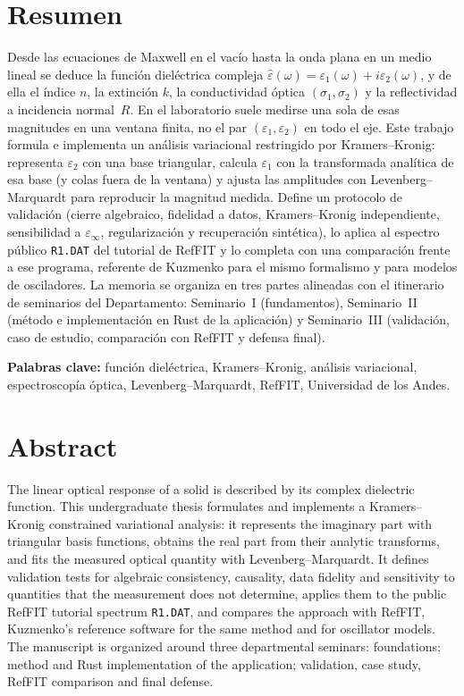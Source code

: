 \documentclass[a4paper,openright,12pt]{book}
\begin{document}
\tableofcontents
\clearpage
\listoffigures
\clearpage
\listoftables

\chapter*{Resumen}
Desde las ecuaciones de Maxwell en el vac\'io hasta la onda plana en un medio lineal se deduce la funci\'on diel\'ectrica compleja
$\hat\varepsilon(\omega)=\varepsilon_1(\omega)+i\varepsilon_2(\omega)$,
y de ella el \'indice $n$, la extinci\'on $k$, la conductividad \'optica $(\sigma_1,\sigma_2)$ y la reflectividad a incidencia normal~$R$.
En el laboratorio suele medirse una sola de esas magnitudes en una ventana finita, no el par $(\varepsilon_1,\varepsilon_2)$ en todo el eje.
Este trabajo formula e implementa un an\'alisis variacional restringido por Kramers--Kronig: representa $\varepsilon_2$ con una base triangular, calcula $\varepsilon_1$ con la transformada anal\'itica de esa base (y colas fuera de la ventana) y ajusta las amplitudes con Levenberg--Marquardt para reproducir la magnitud medida.
Define un protocolo de validaci\'on (cierre algebraico, fidelidad a datos, Kramers--Kronig independiente, sensibilidad a $\varepsilon_\infty$, regularizaci\'on y recuperaci\'on sint\'etica), lo aplica al espectro p\'ublico \texttt{R1.DAT} del tutorial de RefFIT y lo completa con una comparaci\'on frente a ese programa, referente de Kuzmenko para el mismo formalismo y para modelos de osciladores.
La memoria se organiza en tres partes alineadas con el itinerario de seminarios del Departamento: Seminario~I (fundamentos), Seminario~II (m\'etodo e implementaci\'on en Rust de la aplicaci\'on) y Seminario~III (validaci\'on, caso de estudio, comparaci\'on con RefFIT y defensa final).

\vspace{0.8cm}
\noindent\textbf{Palabras clave:} funci\'on diel\'ectrica, Kramers--Kronig, an\'alisis variacional, espectroscop\'ia \'optica, Levenberg--Marquardt, RefFIT, Universidad de los Andes.

\chapter*{Abstract}
The linear optical response of a solid is described by its complex dielectric function.
This undergraduate thesis formulates and implements a Kramers--Kronig constrained variational analysis: it represents the imaginary part with triangular basis functions, obtains the real part from their analytic transforms, and fits the measured optical quantity with Levenberg--Marquardt.
It defines validation tests for algebraic consistency, causality, data fidelity and sensitivity to quantities that the measurement does not determine, applies them to the public RefFIT tutorial spectrum \texttt{R1.DAT}, and compares the approach with RefFIT, Kuzmenko's reference software for the same method and for oscillator models.
The manuscript is organized around three departmental seminars: foundations; method and Rust implementation of the application; validation, case study, RefFIT comparison and final defense.

\mainmatter




\appendix




\end{document}
